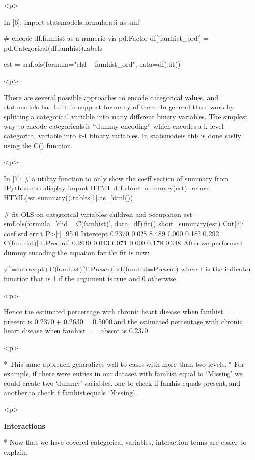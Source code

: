 <p>

	
In [6]:
import statsmodels.formula.api as smf

# encode df.famhist as a numeric via pd.Factor
df['famhist_ord'] = pd.Categorical(df.famhist).labels

est = smf.ols(formula="chd ~ famhist_ord", data=df).fit()


<p>

	
	There are several possible approaches to encode categorical values, and statsmodels has built-in support for many of them. In general these work by splitting a categorical variable into many different binary variables. The simplest way to encode categoricals is “dummy-encoding” which encodes a k-level categorical variable into k-1 binary variables. In statsmodels this is done easily using the C() function.


<p>

	
In [7]:
# a utility function to only show the coeff section of summary
from IPython.core.display import HTML
def short_summary(est):
    return HTML(est.summary().tables[1].as_html())

# fit OLS on categorical variables children and occupation
est = smf.ols(formula='chd ~ C(famhist)', data=df).fit()
short_summary(est)
Out[7]:
coef	std err	t	P>|t|	[95.0%
Intercept	0.2370	0.028	8.489	0.000	0.182 0.292
C(famhist)[T.Present]	0.2630	0.043	6.071	0.000	0.178 0.348
After we performed dummy encoding the equation for the fit is now:

y^=Intercept+C(famhist)[T.Present]×I(famhist=Present)
where I is the indicator function that is 1 if the argument is true and 0 otherwise.


<p>

	
Hence the estimated percentage with chronic heart disease when famhist == present is 0.2370 + 0.2630 = 0.5000 and the estimated percentage with chronic heart disease when famhist == absent is 0.2370.


<p>

	
	
*   This same approach generalizes well to cases with more than two levels. 
*   For example, if there were entries in our dataset with famhist equal to ‘Missing’ we could create two ‘dummy’ variables, one to check if famhis equals present, and another to check if famhist equals ‘Missing’.
	



<p>

	
\textbf{Interactions}

*   Now that we have covered categorical variables, interaction terms are easier to explain.

